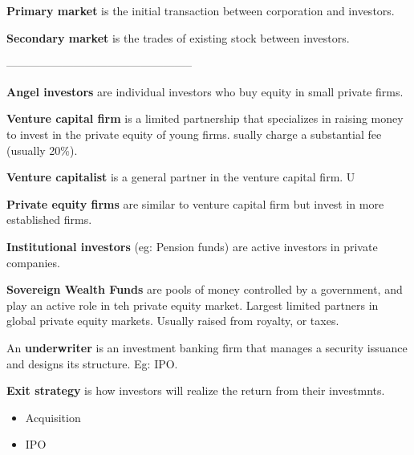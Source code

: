 \documentclass[english, 12pt]{article}
\begin{document}
\begin{defn}
\textbf{Primary market} is the initial transaction between corporation and investors.
\end{defn}
\begin{defn}
\textbf{Secondary market} is the trades of existing stock between investors.
\end{defn}
--------------------------------------------------
\begin{defn}
\textbf{Angel investors} are individual investors who buy equity in small private firms.
\end{defn}
\begin{defn}
\textbf{Venture capital firm} is a limited partnership that specializes in raising money to invest in the private equity of young firms. sually charge a substantial fee (usually 20\%).
\end{defn}
\begin{defn}
\textbf{Venture capitalist} is a general partner in the venture capital firm. U
\end{defn}
\begin{defn}
\textbf{Private equity firms} are similar to venture capital firm but invest in more established firms.
\end{defn}
\begin{defn}
\textbf{Institutional investors} (eg: Pension funds) are active investors in private companies.
\end{defn}
\begin{defn}
\textbf{Sovereign Wealth Funds} are pools of money controlled by a government, and play an active role in teh private equity market. Largest limited partners in global private equity markets. Usually raised from royalty, or taxes.
\end{defn}



\begin{defn}
An \textbf{underwriter} is an investment banking firm that manages a security issuance and designs its structure. Eg: IPO.
\end{defn}


\begin{defn}
\textbf{Exit strategy} is how investors will realize the return from their investmnts.
\begin{itemize}
\item Acquisition
\item IPO
\end{itemize}
\end{defn}
\end{document}
